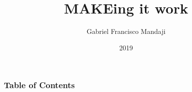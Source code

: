 \documentclass{beamer}
\title{MAKEing it work}
\author{Gabriel Francisco Mandaji}
\date{2019}
\begin{document}
\frame{\titlepage}

\begin{frame}
    \frametitle{Table of Contents}
    \tableofcontents[subsectionstyle=hide]
\end{frame}





%
\end{document}
